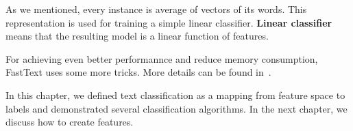 As we mentioned, every instance is average of vectors of its words.
This representation is used for training a simple linear classifier.
\textbf{Linear classifier} means that the resulting model is a linear function
of features.

For achieving even better performannce and reduce memory consumption, FastText uses some more tricks.
More details can be found in~\citet{Joulin2017bag}.








In this chapter, we defined text classification as a mapping from feature space to labels
and demonstrated several classification algorithms.
In the next chapter, we discuss how to create features.
